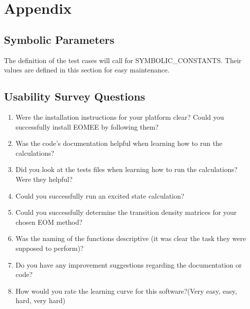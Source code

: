 \documentclass[12pt, titlepage]{article}
\begin{document}
\newpage

\section{Appendix}
\label{section:appendix}


\subsection{Symbolic Parameters}

The definition of the test cases will call for SYMBOLIC\_CONSTANTS.
Their values are defined in this section for easy maintenance.

\subsection{Usability Survey Questions}

\begin{enumerate}
	\item Were the installation instructions for your platform clear? Could you 
	successfully install EOMEE by following them?
	\item Was the code's documentation helpful when learning how to run the 
	calculations?
	\item Did you look at the tests files when learning how to run the 
	calculations? Were they helpful?
	\item Could you successfully run an excited state calculation?
	\item Could you successfully determine the transition density matrices for 
	your chosen EOM method?
	\item Was the naming of the functions descriptive (it was clear the 
	task they were supposed to perform)?
	\item Do you have any improvement suggestions regarding the documentation 
	or code?
	\item How would you rate the learning curve for this software?(Very easy, 
	easy, hard, very hard)
\end{enumerate}
\end{document}
